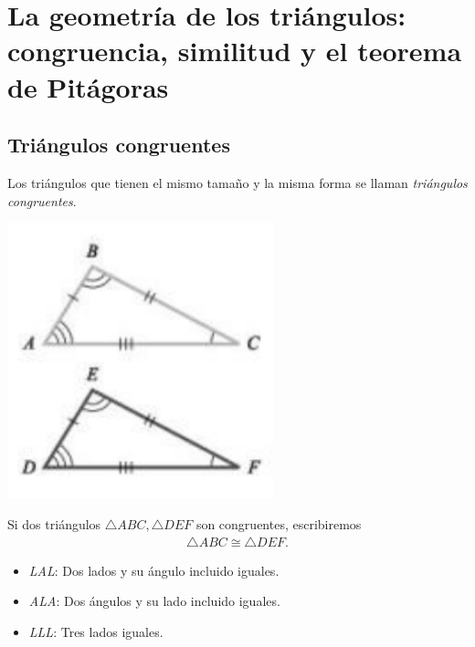 

\section{La geometría de los triángulos: congruencia, similitud y el teorema de Pitágoras}

\subsection{Triángulos congruentes}

{}
	Los triángulos que tienen el mismo tamaño y la misma forma se llaman \emph{triángulos congruentes}.

{}
	\begin{center}
		\includegraphics[height=8cm,keepaspectratio=true]{./trig/algsup3-01.png}
	\end{center}
	

{}
	Si dos triángulos $\triangle ABC, \triangle DEF$ son congruentes, escribiremos \begin{align*}
		\triangle ABC \cong \triangle DEF.
	\end{align*}

{}
	\begin{prop}
		\begin{itemize}
			\item \emph{LAL}: Dos lados y su ángulo incluido iguales.
			\item \emph{ALA}: Dos ángulos y su lado incluido iguales. 
			\item \emph{LLL}: Tres lados iguales. 
		\end{itemize}
		
	\end{prop}
	


